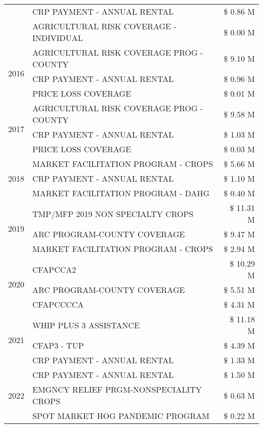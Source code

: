 \begin{tabular}{llr}
 & CRP PAYMENT - ANNUAL RENTAL & \$ 0.86 M \\
 & AGRICULTURAL RISK COVERAGE - INDIVIDUAL & \$ 0.00 M \\
\cline{1-3}
\multirow[t]{3}{*}{2016} & AGRICULTURAL RISK COVERAGE PROG - COUNTY & \$ 9.10 M \\
 & CRP PAYMENT - ANNUAL RENTAL & \$ 0.96 M \\
 & PRICE LOSS COVERAGE & \$ 0.01 M \\
\cline{1-3}
\multirow[t]{3}{*}{2017} & AGRICULTURAL RISK COVERAGE PROG - COUNTY & \$ 9.58 M \\
 & CRP PAYMENT - ANNUAL RENTAL & \$ 1.03 M \\
 & PRICE LOSS COVERAGE & \$ 0.03 M \\
\cline{1-3}
\multirow[t]{3}{*}{2018} & MARKET FACILITATION PROGRAM - CROPS & \$ 5.66 M \\
 & CRP PAYMENT - ANNUAL RENTAL & \$ 1.10 M \\
 & MARKET FACILITATION PROGRAM - DAHG & \$ 0.40 M \\
\cline{1-3}
\multirow[t]{3}{*}{2019} & TMP/MFP 2019 NON SPECIALTY CROPS & \$ 11.31 M \\
 & ARC PROGRAM-COUNTY COVERAGE & \$ 9.47 M \\
 & MARKET FACILITATION PROGRAM - CROPS & \$ 2.94 M \\
\cline{1-3}
\multirow[t]{3}{*}{2020} & CFAPCCA2 & \$ 10.29 M \\
 & ARC PROGRAM-COUNTY COVERAGE & \$ 5.51 M \\
 & CFAPCCCCA & \$ 4.31 M \\
\cline{1-3}
\multirow[t]{3}{*}{2021} & WHIP PLUS 3 ASSISTANCE & \$ 11.18 M \\
 & CFAP3 - TUP & \$ 4.39 M \\
 & CRP PAYMENT - ANNUAL RENTAL & \$ 1.33 M \\
\cline{1-3}
\multirow[t]{3}{*}{2022} & CRP PAYMENT - ANNUAL RENTAL & \$ 1.50 M \\
 & EMGNCY RELIEF PRGM-NONSPECIALITY CROPS & \$ 0.63 M \\
 & SPOT MARKET HOG PANDEMIC PROGRAM & \$ 0.22 M \\
\cline{1-3}
\bottomrule
\end{tabular}
